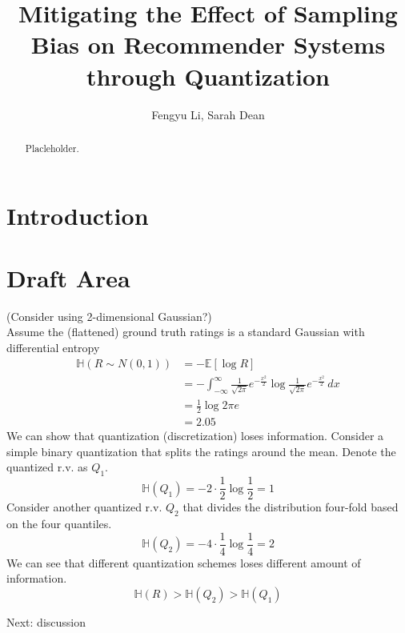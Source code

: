 \documentclass[12pt, letterpaper]{article}
\title{\vspace{-2.0cm}Mitigating the Effect of Sampling Bias on Recommender Systems through Quantization}
\author{Fengyu Li, Sarah Dean}
\date{}
\theoremstyle{definition}\newtheorem*{definition}{Definition}
\theoremstyle{definition}\newtheorem*{example}{Example}
\theoremstyle{definition}\newtheorem*{remark}{Remark}
\def\EE{\mathbb{E}}
\def\HH{\mathbb{H}}
\begin{document}
\maketitle

\begin{abstract}
    Placleholder.
\end{abstract}

\section{Introduction}

\section{Draft Area}
 (Consider using 2-dimensional Gaussian?)\\
Assume the (flattened) ground truth ratings is a standard Gaussian with differential entropy
\begin{align*} \HH(R\sim N(0, 1)) & = -\EE[\log R]                    \\ & = -\int_{-\infty}^\infty \frac{1}{\sqrt{2\pi}}e^{-\frac{x^2}{2}} \log \frac{1}{\sqrt{2\pi}}e^{-\frac{x^2}{2}} \, dx \\
                                  & = \frac{1}{2}\log 2\pi e          \\
                                  & = 2.05
\end{align*}
We can show that quantization (discretization) loses information. Consider
a simple binary quantization that splits the ratings around the mean. Denote the quantized r.v. as $Q_1$.
\[ \HH(Q_1) = -2 \cdot \frac{1}{2} \log \frac{1}{2} = 1 \]
Consider another quantized r.v. $Q_2$ that divides the distribution four-fold based on the four quantiles.
\[ \HH(Q_2) = -4 \cdot \frac{1}{4} \log \frac{1}{4} = 2 \]
We can see that different quantization schemes loses different amount of information.
\[ \HH(R) > \HH(Q_2) > \HH(Q_1) \]

Next: discussion
\end{document}
